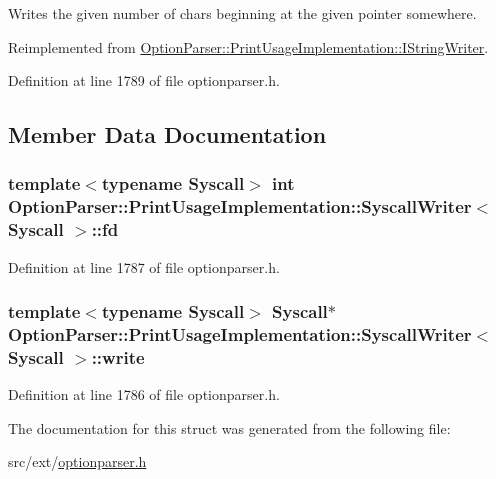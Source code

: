Writes the given number of chars beginning at the given pointer somewhere. 



Reimplemented from \hyperlink{struct_option_parser_1_1_print_usage_implementation_1_1_i_string_writer_acae5e8911028920188394436f9712251}{Option\-Parser\-::\-Print\-Usage\-Implementation\-::\-I\-String\-Writer}.



Definition at line 1789 of file optionparser.\-h.



\subsection{Member Data Documentation}
\hypertarget{struct_option_parser_1_1_print_usage_implementation_1_1_syscall_writer_af64926aa8f6539bd22e77b8d51132fbc}{
\subsubsection[{fd}]{\setlength{\rightskip}{0pt plus 5cm}template$<$typename Syscall$>$ int {\bf Option\-Parser\-::\-Print\-Usage\-Implementation\-::\-Syscall\-Writer}$<$ Syscall $>$\-::fd}}\label{struct_option_parser_1_1_print_usage_implementation_1_1_syscall_writer_af64926aa8f6539bd22e77b8d51132fbc}


Definition at line 1787 of file optionparser.\-h.

\hypertarget{struct_option_parser_1_1_print_usage_implementation_1_1_syscall_writer_a1a2d91d76791d2f6769088ccca1a32dc}{
\subsubsection[{write}]{\setlength{\rightskip}{0pt plus 5cm}template$<$typename Syscall$>$ Syscall$\ast$ {\bf Option\-Parser\-::\-Print\-Usage\-Implementation\-::\-Syscall\-Writer}$<$ Syscall $>$\-::write}}\label{struct_option_parser_1_1_print_usage_implementation_1_1_syscall_writer_a1a2d91d76791d2f6769088ccca1a32dc}


Definition at line 1786 of file optionparser.\-h.



The documentation for this struct was generated from the following file\-:\begin{DoxyCompactItemize}
\item 
src/ext/\hyperlink{optionparser_8h}{optionparser.\-h}\end{DoxyCompactItemize}

